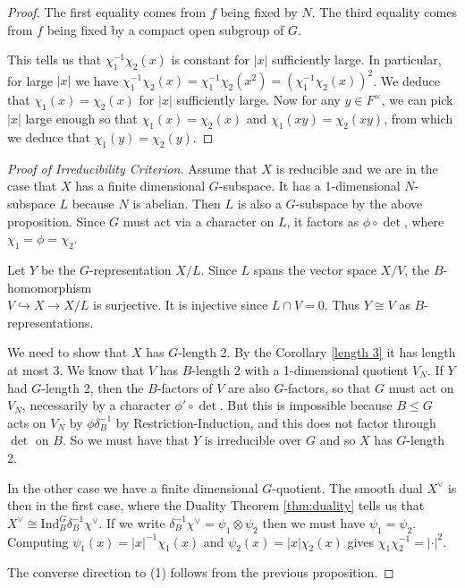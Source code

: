 \begin{proof}
    The first equality comes from $f$ being fixed by $N$. The third equality comes from $f$ being fixed by a compact open subgroup of $G$.

    This tells us that $\chi_1^{-1}\chi_2(x)$ is constant for $|x|$ sufficiently large. In particular, for large $|x|$ we have $\chi_1^{-1}\chi_2(x) = \chi_1^{-1}\chi_2(x^2) = (\chi_1^{-1}\chi_2(x))^2$. We deduce that $\chi_1(x)=\chi_2(x)$ for $|x|$ sufficiently large. Now for any $y \in F^\times$, we can pick $|x|$ large enough so that $\chi_1(x)=\chi_2(x)$ and $\chi_1(xy)=\chi_2(xy)$, from which we deduce that $\chi_1(y)=\chi_2(y)$. 
    
\end{proof}

\begin{proof}[Proof of Irreducibility Criterion]
    Assume that $X$ is reducible and we are in the case that $X$ has a finite dimensional $G$-subspace. It has a 1-dimensional $N$-subspace $L$ because $N$ is abelian. Then $L$ is also a $G$-subspace by the above proposition. Since $G$ must act via a character on $L$, it factors as $\phi \circ \det$, where $\chi_1=\phi=\chi_2$. 

    Let $Y$ be the $G$-representation $X/L$. Since $L$ spans the vector space $X/V$, the $B$-homomorphism \\${V \hookrightarrow X \to X/L}$ is surjective. It is injective since $L \cap V = 0$. Thus $Y \cong V$ as $B$-representations.

    We need to show that $X$ has $G$-length 2. By the Corollary \ref{length 3} it has length at most 3. We know that $V$ has $B$-length 2 with a 1-dimensional quotient $V_N$. If $Y$ had $G$-length 2, then the $B$-factors of $V$ are also $G$-factors, so that $G$ must act on $V_N$, necessarily by a character $\phi' \circ \det$. But this is impossible because $B \leq G$ acts on $V_N$ by $\phi \delta_B^{-1}$ by Restriction-Induction, and this does not factor through $\det$ on $B$. So we must have that $Y$ is irreducible over $G$ and so $X$ has $G$-length 2.

    In the other case we have a finite dimensional $G$-quotient. The smooth dual $X^\vee$ is then in the first case, where the Duality Theorem \ref{thm:duality} tells us that $X^\vee \cong \mathrm{Ind}_B^G \delta_B^{-1} \chi^\vee$. If we write $\delta_B^{-1} \chi^\vee = \psi_1 \otimes \psi_2$ then we must have $\psi_1 = \psi_2$. Computing $\psi_1(x) = |x|^{-1} \chi_1(x)$ and $\psi_2(x) = |x| \chi_2(x)$ gives $\chi_1\chi_2^{-1} = |\cdot|^2$.

    The converse direction to (1) follows from the previous proposition.
\end{proof}


